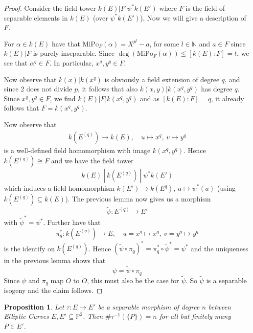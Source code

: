 \documentclass{scrartcl}
\newcommand{\N}{\mathbb{N}}
\newcommand{\Proj}{\mathbb{P}}
\renewcommand{\O}{O}
\newtheorem{prop}{Proposition}[section]
\theoremstyle{definition}
\begin{document}
\begin{proof}
    Consider the field tower $k(E) | F | \psi^*k(E')$ where $F$ is the field of separable elements in $k(E)$ (over $\psi^*k(E')$).
    Now we will give a description of $F$.

    For $\alpha \in k(E)$ have that $\mathrm{MiPo}_F(\alpha) = X^{p^l} -  a$, for some $l \in \N$ and $a \in F$ since $k(E) | F$ is purely inseparable.
    Since $\deg(\mathrm{MiPo}_F(\alpha)) \leq [k(E) : F] = t$, we see that $\alpha^q \in F$.
    In particular, $x^q, y^q \in F$.

    Now observe that $k(x) | k(x^q)$ is obviously a field extension of degree $q$, and since 2 does not divide $p$, it follows that also $k(x, y) | k(x^q, y^q)$ has degree $q$.
    Since $x^q, y^q \in F$, we find $k(E) | F | k(x^q, y^q)$ and as $[k(E) : F] = q$, it already follows that $F = k(x^q, y^q)$.

    Now observe that
    \begin{align*}
        k(E^{(q)}) \to k(E), \quad u \mapsto x^q, \ v \mapsto y^q
    \end{align*}
    is a well-defined field homomorphism with image $k(x^q, y^q)$.
    Hence $k(E^{(q)}) \cong F$ and we have the field tower
    \begin{equation*}
        k(E) \ | \ k(E^{(q)}) \ | \ \psi^*k(E')
    \end{equation*}
    which induces a field homomorphism $k(E') \to k(E^{q}), \ a \mapsto \psi^*(a)$ (using $k(E^{(q)}) \subseteq k(E)$).
    The previous lemma now gives us a morphism
    \begin{equation*}
        \tilde{\psi}: E^{(q)} \to E'
    \end{equation*}
    with $\tilde{\psi}^* = \psi^*$.
    Further have that
    \begin{equation*}
        \pi_q^*: k(E^{(q)}) \to E, \quad u = x^q \mapsto x^q, \ v = y^q \mapsto y^q
    \end{equation*}
    is the identify on $k(E^{(q)})$.
    Hence $(\tilde{\psi} \circ \pi_q)^* = \pi_q^* \circ \tilde{\psi}^* = \psi^*$ and the uniqueness in the previous lemma shows that
    \begin{equation*}
        \psi = \tilde{\psi} \circ \pi_q
    \end{equation*}
    Since $\psi$ and $\pi_q$ map $\O$ to $\O$, this must also be the case for $\tilde{\psi}$.
    So $\tilde{\psi}$ is a separable isogeny and the claim follows.
\end{proof}
\begin{prop}
    Let $\tau: E \to E'$ be a separable morphism of degree $n$ between Elliptic Curves $E, E' \subseteq \Proj^2$.
    Then $\#\tau^{-1}(\{P\}) = n$ for all but finitely many $P \in E'$.
\end{prop}
\end{document}
